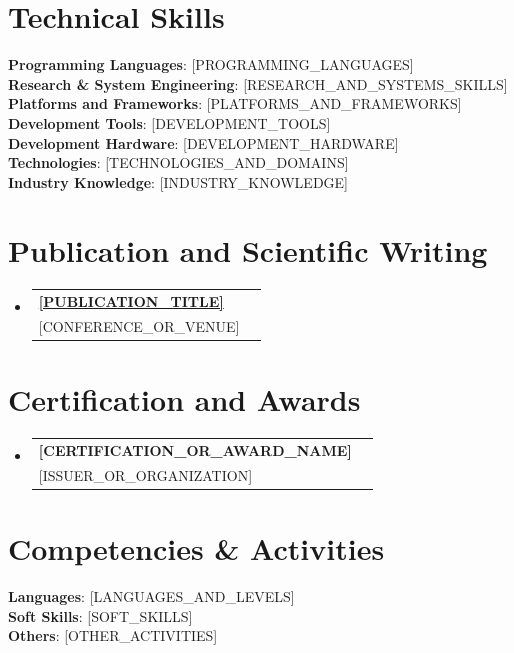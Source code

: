 \documentclass[a4paper,11pt]{article}
\makeatletter
\newcommand{\CVSubheading}[4]{
  \vspace{-2pt}\item
    \begin{tabular*}{0.97\textwidth}[t]{l@{\extracolsep{\fill}}r}
      \textbf{#1} & #2 \\
      \small#3 & \small #4 \\
    \end{tabular*}\vspace{-7pt}
}
\newcommand{\CVSubHeadingListStart}{\begin{itemize}[leftmargin=0.5cm, label={}]}
\newcommand{\CVSubHeadingListEnd}{\end{itemize}}
\makeatother
\begin{document}
\section{Technical Skills}
 \begin{itemize}[leftmargin=0.5cm, label={}]
    \small{\item{
     \textbf{Programming Languages}{: [PROGRAMMING_LANGUAGES]} \\
     \textbf{Research \& System Engineering}{: [RESEARCH_AND_SYSTEMS_SKILLS]} \\
     \textbf{Platforms and Frameworks}{: [PLATFORMS_AND_FRAMEWORKS]} \\
     \textbf{Development Tools}{: [DEVELOPMENT_TOOLS]} \\
     \textbf{Development Hardware}{: [DEVELOPMENT_HARDWARE]} \\
     \textbf{Technologies}{: [TECHNOLOGIES_AND_DOMAINS]} \\
     \textbf{Industry Knowledge}{: [INDUSTRY_KNOWLEDGE]} \\
    }}
 \end{itemize}

\section{Publication and Scientific Writing}
  \CVSubHeadingListStart
    \CVSubheading
      {\href{[DOI_OR_URL]}{[PUBLICATION_TITLE]}}{}
      {[CONFERENCE_OR_VENUE]}{}
  \CVSubHeadingListEnd

\section{Certification and Awards}
  \CVSubHeadingListStart
    \CVSubheading
      {[CERTIFICATION_OR_AWARD_NAME]}{}
      {[ISSUER_OR_ORGANIZATION]}{}
  \CVSubHeadingListEnd

\section{Competencies \& Activities}
 \begin{itemize}[leftmargin=0.5cm, label={}]
    \small{\item{
     \textbf{Languages}{: [LANGUAGES_AND_LEVELS]} \\
     \textbf{Soft Skills}{: [SOFT_SKILLS]} \\
     \textbf{Others}{: [OTHER_ACTIVITIES]} \\
    }}
 \end{itemize}
\end{document}
